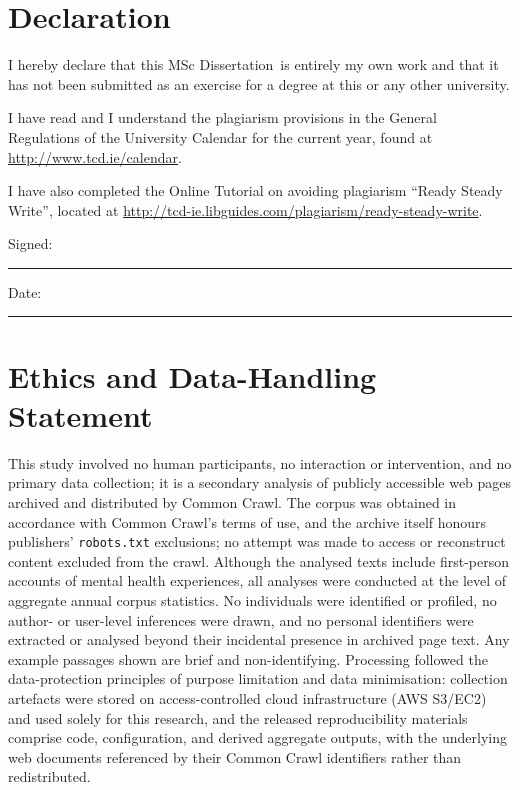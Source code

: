 \documentclass[a4paper,oneside,12pt]{book}
\newcommand{\typeofthesis}{MSc Dissertation}
\begin{document}
\frontmatter

\doublespacing

\section*{Declaration}
I hereby declare that this \typeofthesis\ is entirely my own work and that it has not been submitted as an exercise for a degree at this or any other university.

I have read and I understand the plagiarism provisions in the General Regulations of the University Calendar for the current year, found at \url{http://www.tcd.ie/calendar}.

I have also completed the Online Tutorial on avoiding plagiarism ``Ready Steady Write'', located at \url{http://tcd-ie.libguides.com/plagiarism/ready-steady-write}.

\vspace{1cm}
Signed:~\rule{5cm}{0.3pt}\hfill Date:~\rule{5cm}{0.3pt}

\newpage

\section*{Ethics and Data-Handling Statement}
This study involved no human participants, no interaction or intervention, and no primary data collection; it is a secondary analysis of publicly accessible web pages archived and distributed by Common Crawl. The corpus was obtained in accordance with Common Crawl's terms of use, and the archive itself honours publishers' \texttt{robots.txt} exclusions; no attempt was made to access or reconstruct content excluded from the crawl. Although the analysed texts include first-person accounts of mental health experiences, all analyses were conducted at the level of aggregate annual corpus statistics. No individuals were identified or profiled, no author- or user-level inferences were drawn, and no personal identifiers were extracted or analysed beyond their incidental presence in archived page text. Any example passages shown are brief and non-identifying. Processing followed the data-protection principles of purpose limitation and data minimisation: collection artefacts were stored on access-controlled cloud infrastructure (AWS S3/EC2) and used solely for this research, and the released reproducibility materials comprise code, configuration, and derived aggregate outputs, with the underlying web documents referenced by their Common Crawl identifiers rather than redistributed.
\end{document}
